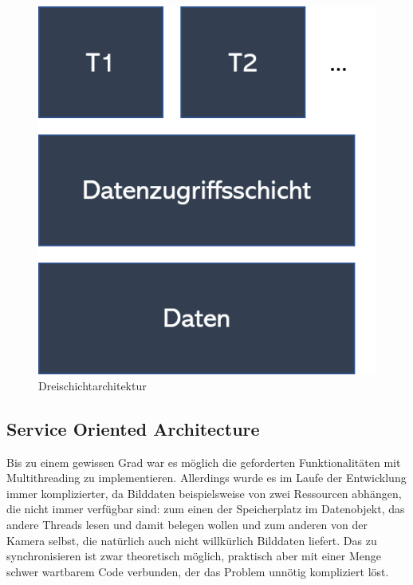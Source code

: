 \begin{figure}[h]
	\centering
	\includegraphics[scale=0.5]{"Grafiken/dreischichtarchitektur.png"}
	\caption{Dreischichtarchitektur}
	\label{fig:Dreischichtarchitektur}
\end{figure}



\subsection{Service Oriented Architecture}
Bis zu einem gewissen Grad war es möglich die geforderten Funktionalitäten mit Multithreading zu implementieren. Allerdings wurde es im Laufe der Entwicklung immer komplizierter, da Bilddaten beispielsweise von zwei Ressourcen abhängen, die nicht immer verfügbar sind: zum einen der Speicherplatz im Datenobjekt, das andere Threads lesen und damit belegen wollen und zum anderen von der Kamera selbst, die natürlich auch nicht willkürlich Bilddaten liefert. Das zu synchronisieren ist zwar theoretisch möglich, praktisch aber mit einer Menge schwer wartbarem Code verbunden, der das Problem unnötig kompliziert löst.
